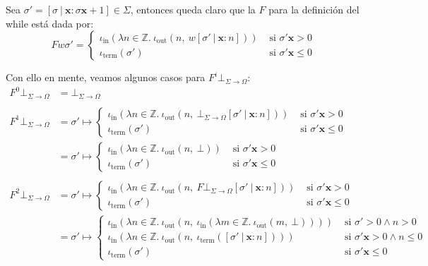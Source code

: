 \documentclass{article}
\newcommand{\Z}{\mathbb{Z}}
\newcommand{\x}{\textbf{x}}
\newcommand{\cdomfo}{\Sigma \to \Omega}
\newcommand{\cfbotfo}{\bot_{\cdomfo}}
\newcommand{\iterm}[1]{\iota_\text{term}\left(#1\right)}
\newcommand{\iout}[2]{\iota_\text{out}\left(#1,\ #2\right)}
\newcommand{\iin}[2]{\iota_\text{in}\left(\lambda #1 \in \Z .\ #2\right)}
\begin{document}
Sea $\sigma' = [\sigma\ |\ \x : \sigma\x+1] \in \Sigma$, entonces queda claro que la $F$ para la definición del while está dada por:
\begin{equation*}
  Fw\sigma' = \begin{cases}
    \iin{n}{\iout{n}{w [\sigma'\ |\ \x : n]}} &\text{ si }\sigma'\x > 0 \\ 
    \iterm{\sigma'} &\text{ si }\sigma'\x \leq 0
  \end{cases}
\end{equation*}

Con ello en mente, veamos algunos casos para $F^i \cfbotfo$:
\begin{equation*}
  \begin{aligned}
    F^0 \cfbotfo &= \cfbotfo \\ 
    \\ 
    F^1 \cfbotfo &= \sigma' \mapsto \begin{cases}
                  \iin{n}{\iout{n}{\cfbotfo [\sigma'\ |\ \x : n]}} &\text{ si }\sigma'\x > 0 \\ 
                  \iterm{\sigma'} &\text{ si }\sigma'\x \leq 0
                \end{cases} \\ 
                 &= \sigma' \mapsto \begin{cases}
                  \iin{n}{\iout{n}{\bot}} &\text{ si }\sigma'\x > 0 \\ 
                  \iterm{\sigma'} &\text{ si }\sigma'\x \leq 0
                 \end{cases} \\ 
                 \\ 
    F^2 \cfbotfo &= \sigma' \mapsto \begin{cases}
                  \iin{n}{\iout{n}{F \cfbotfo [\sigma'\ |\ \x : n]}} &\text{ si }\sigma'\x > 0 \\ 
                  \iterm{\sigma'} &\text{ si }\sigma'\x \leq 0
                \end{cases} \\ 
                 &= \sigma' \mapsto \begin{cases}
                   \iin{n}{\iout{n}{\iin{m}{\iout{m}{\bot}}}} &\text{ si }\sigma'>0 \land n > 0 \\ 
                   \iin{n}{\iout{n}{\iterm{[\sigma'\ |\ \x : n]}}} &\text{ si }\sigma'\x>0 \land n \leq 0 \\ 
                   \iterm{\sigma'} &\text{ si }\sigma'\x \leq 0
                 \end{cases}
  \end{aligned}
\end{equation*}
\end{document}
